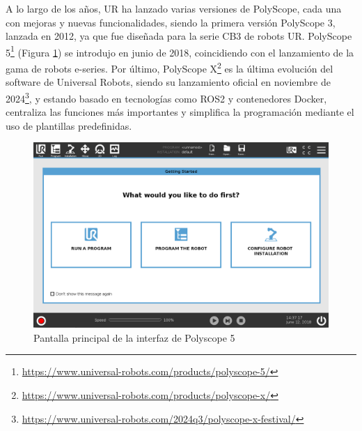 A lo largo de los años, UR ha lanzado varias versiones de PolyScope, cada una con mejoras y nuevas funcionalidades, siendo la primera versión PolyScope 3, lanzada en 2012, ya que fue diseñada para la serie CB3 de robots UR. PolyScope 5\footnote{\url{https://www.universal-robots.com/products/polyscope-5/}} (Figura \ref{fig:Polyscope5}) se introdujo en junio de 2018, coincidiendo con el lanzamiento de la gama de robots e-series. Por último, PolyScope X\footnote{\url{https://www.universal-robots.com/products/polyscope-x/}} es la última evolución del software de Universal Robots, siendo su lanzamiento oficial en noviembre de 2024\footnote{\url{https://www.universal-robots.com/2024q3/polyscope-x-festival/}}, y estando basado en tecnologías como ROS2 y contenedores Docker, centraliza las funciones más importantes y simplifica la programación mediante el uso de plantillas predefinidas. %

\begin{figure} [H]
    \begin{center}
      \includegraphics[width=15cm]{figs/InterfazPolyscope5.png}
    \end{center}
    \caption{Pantalla principal de la interfaz de Polyscope 5}
    \label{fig:Polyscope5}
\end{figure}

